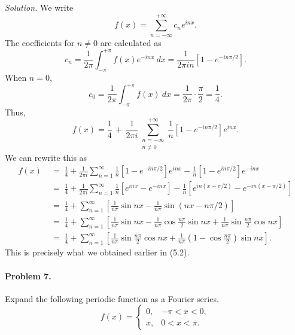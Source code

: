 \documentclass[10pt]{article}
\begin{document}
        \textit{Solution.} We write
        \[
                f(x) = \sum_{n = -\infty}^{+\infty} c_n e^{inx}.
        \]
        The coefficients for $n \neq 0$ are calculated as
        \[
                c_n = \frac{1}{2\pi} \int_{-\pi}^{+\pi} f(x)e^{-inx}\:dx = \frac{1}{2\pi in} \left[1 - e^{-in\pi /2}\right].
        \]
        When $n = 0$,
        \[
                c_0 = \frac{1}{2\pi}\int_{-\pi}^{+\pi} f(x)\:dx = \frac{1}{2\pi}\cdot \frac{\pi}{2} = \frac{1}{4}.
        \]
        Thus,
        \[
                f(x) = \frac{1}{4} \,+\, \frac{1}{2\pi i}\sum_{\substack{n = -\infty \\n \neq 0}}^{+\infty} \frac{1}{n}\left[1 - e^{-in\pi /2}\right]e^{inx}.
        \]
        We can rewrite this as
        \begin{align*}
                f(x) \;&=\; \frac{1}{4} + \frac{1}{2\pi i}\sum_{n = 1}^{\infty} \frac{1}{n}\left[1 - e^{-in\pi/2}\right]e^{inx} - 
                                \frac{1}{n}\left[1 - e^{in\pi/2}\right]e^{-inx} \\
                        \;&=\; \frac{1}{4} + \frac{1}{2\pi i} \sum_{n = 1}^\infty \frac{1}{n}\left[ e^{inx} - e^{-inx}\right] - 
                                \frac{1}{n}\left[e^{in(x - \pi /2)} - e^{-in(x - \pi /2)}\right] \\
                        \;&=\; \frac{1}{4} + \sum_{n = 1}^\infty \left[\frac{1}{n\pi}\sin{nx} - \frac{1}{n\pi}\sin(nx - n\pi/2)\right] \\
                        \;&=\; \frac{1}{4} + \sum_{n = 1}^\infty \left[\frac{1}{n\pi}\sin{nx} - 
                                \frac{1}{n\pi}\cos\frac{n\pi}{2}\sin{nx} + \frac{1}{n\pi}\sin\frac{n\pi}{2}\cos{nx}\right] \\
                        \;&=\; \frac{1}{4} + \sum_{n = 1}^\infty \left[ \frac{1}{n\pi}\sin\frac{n\pi}{2}\cos{nx} + 
                        \frac{1}{n\pi}\left(1 - \cos\frac{n\pi}{2}\right)\sin{nx} \right].
        \end{align*}
        This is precisely what we obtained earlier in (5.2).
        
        \paragraph{Problem 7.} Expand the following periodic function as a Fourier series.
        \[
                f(x) = \begin{cases}
                        0, & -\pi < x < 0,      \\
                        x, & 0 < x < \pi.
                \end{cases}
        \]
        
\end{document}

